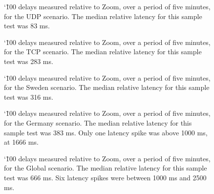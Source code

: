 \documentclass{kththesis}
\begin{document}
\begin{figure}[htbp]
  \centering
  
  \caption{\char`\~100 delays measured relative to Zoom, over a period of five minutes, for the UDP scenario. The median relative latency for this sample test was 83 ms.}
  \label{fig:UDPSampleTest}
\end{figure}

\begin{figure}[htbp]
  \centering
  
  \caption{\char`\~100 delays measured relative to Zoom, over a period of five minutes, for the TCP scenario. The median relative latency for this sample test was 283 ms.}
  \label{fig:TCPSampleTest}
\end{figure}

\begin{figure}[htbp]
  \centering
  
  \caption{\char`\~100 delays measured relative to Zoom, over a period of five minutes, for the Sweden scenario. The median relative latency for this sample test was 316 ms.}
  \label{fig:swedenSampleTest}
\end{figure}

\begin{figure}[htbp]
  \centering
  
  \caption{\char`\~100 delays measured relative to Zoom, over a period of five minutes, for the Germany scenario. The median relative latency for this sample test was 383 ms. Only one latency spike was above 1000 ms, at 1666 ms.}
  \label{fig:germanySampleTest}
\end{figure}

\begin{figure}[htbp]
  \centering
  
  \caption{\char`\~100 delays measured relative to Zoom, over a period of five minutes, for the Global scenario. The median relative latency for this sample test was 666 ms. Six latency spikes were between 1000 ms and 2500 ms.}
  \label{fig:globalSampleTest}
\end{figure}

\tailmatter
\end{document}
